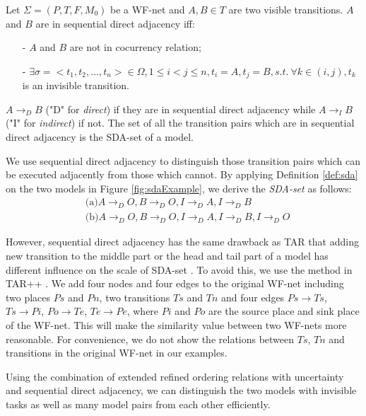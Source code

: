\documentclass{llncs}
\begin{document}
\begin{definition}\label{def:sda}
Let $\Sigma=(P,T,F,M_{0})$ be a WF-net and $A,B\in T$ are two visible transitions. $A$ and $B$ are in sequential direct adjacency iff:
	\begin{itemize}
		\item[-] $A$ and $B$ are not in cocurrency relation;
		\item[-] $\exists\sigma=<t_{1},t_{2},...,t_{n}>\in\Omega,1\leq i<j\leq n,t_{i}=A,t_{j}=B,s.t.~\forall k\in(i,j),t_{k}$ is an invisible transition.
	\end{itemize}
$A\rightarrow_{D}B$ ("D" for \textit{direct}) if they are in sequential direct adjacency while $A\rightarrow_{I}B$ ("I" for \textit{indirect}) if not. The set of all the transition pairs which are in sequential direct adjacency is the SDA-set of a model.
\end{definition}

We use sequential direct adjacency to distinguish those transition pairs which can be executed adjacently from those which cannot. By applying Definition \ref{def:sda} on the two models in Figure \ref{fig:sdaExample}, we derive the \textit{SDA-set} as follows:
\begin{displaymath}
	\begin{aligned}
		&\text{(a)} A\rightarrow_{D}O, B\rightarrow_{D}O, I\rightarrow_{D}A, I\rightarrow_{D}B\\
		&\text{(b)} A\rightarrow_{D}O, B\rightarrow_{D}O, I\rightarrow_{D}A, I\rightarrow_{D}B, I\rightarrow_{D}O
	\end{aligned}
\end{displaymath}

However, sequential direct adjacency has the same drawback as TAR that adding new transition to the middle part or the head and tail part of a model has different influence on the scale of SDA-set \cite{wang2015tar++}. To avoid this, we use the method in TAR++ \cite{wang2015tar++}. We add four nodes and four edges to the original WF-net including two places $Ps$ and $Pn$, two transitions $Ts$ and $Tn$ and four edges $Ps\rightarrow Ts$, $Ts\rightarrow Pi$, $Po\rightarrow Te$, $Te\rightarrow Pe$, where $Pi$ and $Po$ are the source place and sink place of the WF-net. This will make the similarity value between two WF-nets more reasonable. For convenience, we do not show the relations between $Ts$, $Tn$ and transitions in the original WF-net in our examples.

Using the combination of extended refined ordering relations with uncertainty and sequential direct adjacency, we can distinguish the two models with invisible tasks as well as many model pairs from each other efficiently.
\end{document}
